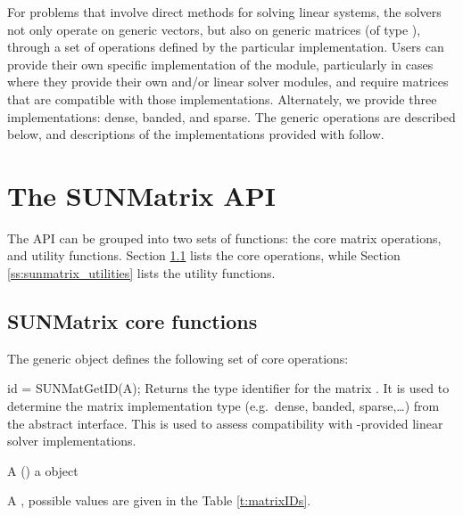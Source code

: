 %
For problems that involve direct methods for solving linear systems,
the {\sundials} solvers not only operate on generic vectors, but also
on generic matrices (of type ), through a set of
operations defined by the particular {\sunmatrix} implementation.
Users can provide their own specific implementation of the
{\sunmatrix} module, particularly in cases where they provide their
own {\nvector} and/or linear solver modules, and require matrices that
are compatible with those implementations.  Alternately, we provide three
{\sunmatrix} implementations: dense, banded, and sparse.  The
generic operations are described below, and descriptions of the
implementations provided with {\sundials} follow.

\section{The SUNMatrix API}
\label{s:sunmatrix_api}

The {\sunmatrix} API can be grouped into two sets of functions:
the core matrix operations, and utility functions. Section \ref{ss:sunmatrix_functions}
lists the core operations, while Section \ref{ss:sunmatrix_utilities} lists
the utility functions.

\subsection{SUNMatrix core functions}\label{ss:sunmatrix_functions}

The generic  object defines the following set of core operations:

{
  id = SUNMatGetID(A);
}
{
  Returns the type identifier for the matrix . It is used to determine the
  matrix implementation type (e.g.~dense, banded, sparse,\ldots) from the abstract
   interface.  This is used to assess compatibility with
  {\sundials}-provided linear solver implementations.
}
{
  \begin{args}[c]
  \item[A] () a {\sunmatrix} object
  \end{args}
}
{
  A , possible values are given in the Table \ref{t:matrixIDs}.
}
{}

